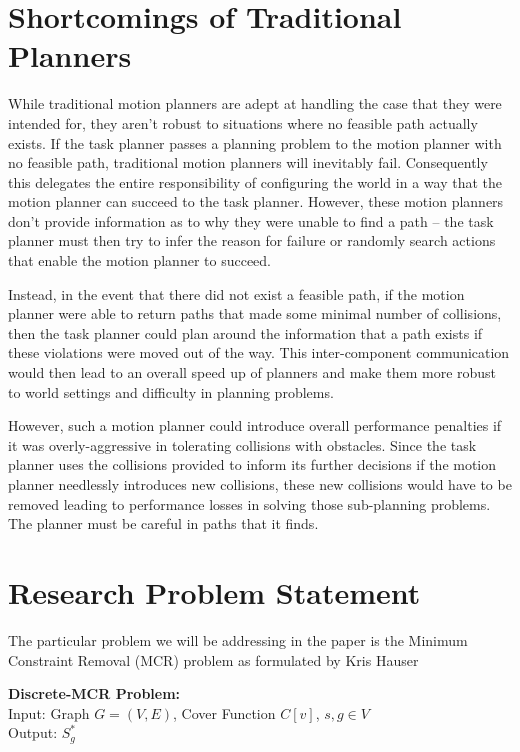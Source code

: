 \section{Shortcomings of Traditional Planners} \label{intro:shortcomings}
While traditional motion planners are adept at handling the case that they were intended for, they aren't robust to situations where no feasible path actually exists. If the task planner passes a planning problem to the motion planner with no feasible path, traditional motion planners will inevitably fail. Consequently this delegates the entire responsibility of configuring the world in a way that the motion planner can succeed to the task planner. However, these motion planners don't provide information as to why they were unable to find a path -- the task planner must then try to infer the reason for failure or randomly search actions that enable the motion planner to succeed.

Instead, in the event that there did not exist a feasible path, if the motion planner were able to return paths that made some minimal number of collisions, then the task planner could plan around the information that a path exists if these violations were moved out of the way. This inter-component communication would then lead to an overall speed up of planners and make them more robust to world settings and difficulty in planning problems.

However, such a motion planner could introduce overall performance penalties if it was overly-aggressive in tolerating collisions with obstacles. Since the task planner uses the collisions provided to inform its further decisions if the motion planner needlessly introduces new collisions, these new collisions would have to be removed leading to performance losses in solving those sub-planning problems. The planner must be careful in paths that it finds.

\section{Research Problem Statement} \label{intro:statement}
The particular problem we will be addressing in the paper is the Minimum Constraint Removal (MCR) problem as formulated by Kris Hauser \cite{hauser:mcr}
\newline

\noindent
{\bf{Discrete-MCR Problem:}}\\
Input: Graph $G = (V,E)$, Cover Function $C[v]$, $s,g \in V$  \\
Output: $S^{*}_g$
\newline

